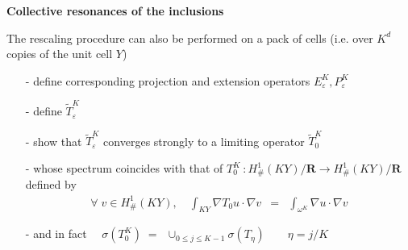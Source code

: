 \documentclass[mathserif,9pt]{beamer}
\def\e{{\varepsilon}}
\def\ds{\displaystyle}
\def\R{\mathbf R}
\begin{document}
\begin{frame}
\small{

\textcolor{ox}{\bf Collective resonances of the inclusions}
\vspace*{5mm}

The rescaling procedure can also be performed on a pack of cells
(i.e. over $K^d$ copies of the unit cell $Y$)
\medskip

\begin{itemize}
\item[-] define corresponding projection and extension operators
$E_\e^K, P_\e^K$
\medskip

\item[-] define $\tilde{T}_\e^K$ 
\medskip

\item[-]
show that $\tilde{T}_\e^K$ converges strongly to a limiting operator $\tilde{T}_0^K$
\medskip

\item[-]
whose spectrum coincides with that of 
$T_0^K~: H^1_\#(KY)/\R \longrightarrow H^1_\#(KY)/\R$
defined by
\textcolor{ox}{
\begin{eqnarray*}
\forall\; v \in H^1_\#(KY), \quad
\ds\int_{KY} \nabla T_0 u \cdot \nabla v
&=&
\ds\int_{\omega^K} \nabla u \cdot \nabla v
\end{eqnarray*}}
\medskip

\item[-] and in fact
\textcolor{ox}{
$\quad \sigma(T_0^K) \;=\;\ \cup_{0 \leq j \leq K-1} \sigma(T_{\eta})
\quad\quad \eta = j/K $}
\end{itemize}

}
\end{frame}
\end{document}
